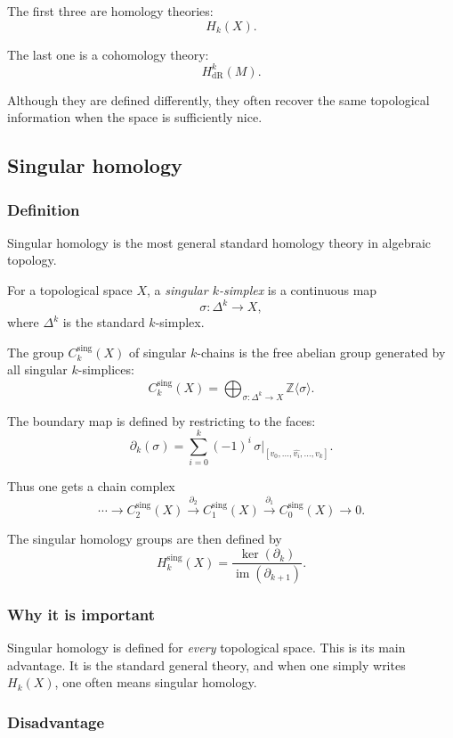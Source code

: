 \documentclass[12pt,a4paper]{article}
\theoremstyle{notespace}
\begin{document}
The first three are homology theories:
\[
H_k(X).
\]

The last one is a cohomology theory:
\[
H^k_{\mathrm{dR}}(M).
\]

Although they are defined differently, they often recover the same topological information when the space is sufficiently nice.

\subsection{ Singular homology}

\subsubsection{Definition}

Singular homology is the most general standard homology theory in algebraic topology.

For a topological space \(X\), a \emph{singular \(k\)-simplex} is a continuous map
\[
\sigma:\Delta^k\to X,
\]
where \(\Delta^k\) is the standard \(k\)-simplex.

The group \(C_k^{\mathrm{sing}}(X)\) of singular \(k\)-chains is the free abelian group generated by all singular \(k\)-simplices:
\[
C_k^{\mathrm{sing}}(X)=\bigoplus_{\sigma:\Delta^k\to X}\mathbb Z\langle \sigma\rangle.
\]

The boundary map is defined by restricting to the faces:
\[
\partial_k(\sigma)=\sum_{i=0}^k(-1)^i\,\sigma|_{[v_0,\dots,\widehat{v_i},\dots,v_k]}.
\]

Thus one gets a chain complex
\[
\cdots \to C_2^{\mathrm{sing}}(X)\xrightarrow{\partial_2}
C_1^{\mathrm{sing}}(X)\xrightarrow{\partial_1}
C_0^{\mathrm{sing}}(X)\to 0.
\]

The singular homology groups are then defined by
\[
H_k^{\mathrm{sing}}(X)=\frac{\ker(\partial_k)}{\operatorname{im}(\partial_{k+1})}.
\]

\subsubsection{Why it is important}

Singular homology is defined for \emph{every} topological space. This is its main advantage. It is the standard general theory, and when one simply writes \(H_k(X)\), one often means singular homology.

\subsubsection{Disadvantage}
\end{document}
